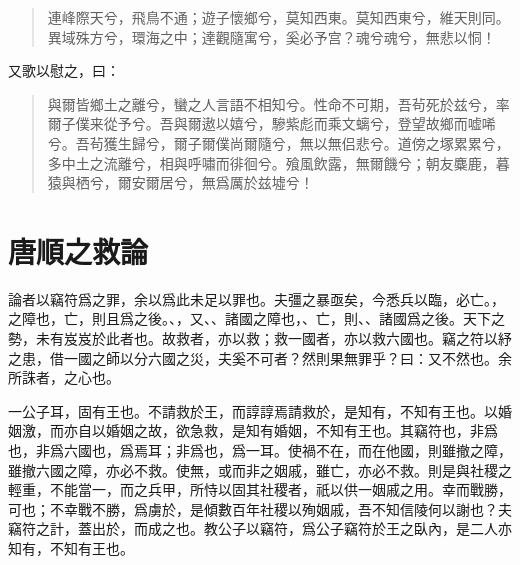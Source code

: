 \begin{quote}
連峰際天兮，飛鳥不通；遊子懷鄉兮，莫知西東。莫知西東兮，維天則同。異域殊方兮，環海之中；達觀隨寓兮，{奚}必予宫？魂兮魂兮，無悲以恫！
\end{quote}%

又歌以慰之，曰：

\begin{quote}
與爾皆鄉土之離兮，蠻之人言語不相知兮。性命不可期，吾茍死於兹兮，率爾子僕来從予兮。吾與爾遨以嬉兮，驂紫彪而乘文螭兮，登望故鄉而嘘唏兮。吾茍獲生歸兮，爾子爾僕尚爾隨兮，{無以無侣悲兮}。道傍之塚累累兮，多中土之流離兮，相與呼嘯而徘徊兮。飱風飲露，無爾饑兮；朝友麋鹿，暮猿與栖兮，爾安爾居兮，無爲厲於兹墟兮！
\end{quote} %

\theendnotes

\section[信陵君救趙論\quad{\small 唐順之}]{{\normalsize 唐順之}\quad {}救論}
論者以竊符爲之罪，余以爲此未足以罪也。夫彊之暴亟矣，今悉兵以臨，必亡。，之障也，亡，則且爲之後。、，又、、諸國之障也，、亡，則、、諸國爲之後。天下之勢，未有岌岌於此者也。故救者，亦以救；救一國者，亦以救六國也。竊之符以紓之患，借一國之師以分六國之災，夫奚不可者？然則果無罪乎？曰：又不然也。余所誅者，之心也。

一公子耳，固有王也。不請救於王，而諄諄焉請救於，是知有，不知有王也。以婚姻激，而亦自以婚姻之故，欲急救，是知有婚姻，不知有王也。其竊符也，非爲也，非爲六國也，爲焉耳；非爲也，爲一耳。使禍不在，而在他國，則雖撤之障，雖撤六國之障，亦必不救。使無，或而非之姻戚，雖亡，亦必不救。則是與社稷之輕重，不能當一，而之兵甲，所恃以固其社稷者，祇以供一姻戚之用。幸而戰勝，可也；不幸戰不勝，爲虜於，是傾數百年社稷以殉姻戚，吾不知信陵何以謝也？夫竊符之計，蓋出於，而成之也。教公子以竊符，爲公子竊符於王之臥內，是二人亦知有，不知有王也。

